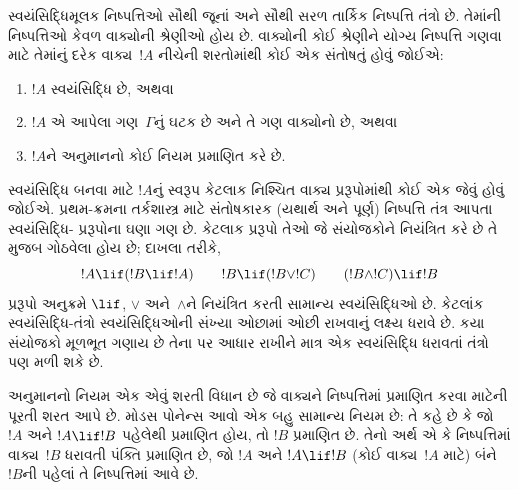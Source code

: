 \begingroup
\makeatletter{}\makeatother


\label{guunit:OLP-0068}


સ્વયંસિદ્ધિમૂલક નિષ્પત્તિઓ સૌથી જૂનાં અને સૌથી સરળ તાર્કિક
નિષ્પત્તિ તંત્રો છે. તેમાંની નિષ્પત્તિઓ કેવળ વાક્યોની
શ્રેણીઓ હોય છે. વાક્યોની કોઈ શ્રેણીને યોગ્ય નિષ્પત્તિ
ગણવા માટે તેમાંનું દરેક વાક્ય~$!A$ નીચેની શરતોમાંથી કોઈ એક
સંતોષતું હોવું જોઈએ:
\begin{enumerate}
\item $!A$ સ્વયંસિદ્ધિ છે, અથવા
\item $!A$ એ આપેલા ગણ~$\Gamma$નું ઘટક છે અને તે ગણ
  વાક્યોનો છે, અથવા
\item $!A$ને અનુમાનનો કોઈ નિયમ પ્રમાણિત કરે છે.
\end{enumerate}
સ્વયંસિદ્ધિ બનવા માટે $!A$નું સ્વરૂપ કેટલાક નિશ્ચિત વાક્ય
પ્રરૂપોમાંથી કોઈ એક જેવું હોવું જોઈએ. પ્રથમ-ક્રમના તર્કશાસ્ત્ર માટે
સંતોષકારક (યથાર્થ અને પૂર્ણ) નિષ્પત્તિ તંત્ર આપતા સ્વયંસિદ્ધિ-
પ્રરૂપોના ઘણા ગણ છે. કેટલાક પ્રરૂપો તેઓ જે સંયોજકોને નિયંત્રિત કરે છે
તે મુજબ ગોઠવેલા હોય છે; દાખલા તરીકે,
\[
!A \lif (!B \lif !A) \qquad !B \lif (!B \lor !C) \qquad (!B \land !C) \lif !B
\]
પ્રરૂપો અનુક્રમે $\lif$, $\lor$ અને~$\land$ને નિયંત્રિત કરતી સામાન્ય
સ્વયંસિદ્ધિઓ છે. કેટલાંક સ્વયંસિદ્ધિ-તંત્રો સ્વયંસિદ્ધિઓની સંખ્યા
ઓછામાં ઓછી રાખવાનું લક્ષ્ય ધરાવે છે. કયા સંયોજકો મૂળભૂત ગણાય છે તેના
પર આધાર રાખીને માત્ર એક સ્વયંસિદ્ધિ ધરાવતાં તંત્રો પણ મળી શકે છે.

અનુમાનનો નિયમ એક એવું શરતી વિધાન છે જે વાક્યને
નિષ્પત્તિમાં પ્રમાણિત કરવા માટેની પૂરતી શરત આપે છે. મોડસ પોનેન્સ
આવો એક બહુ સામાન્ય નિયમ છે: તે કહે છે કે જો $!A$ અને $!A \lif !B$
પહેલેથી પ્રમાણિત હોય, તો $!B$ પ્રમાણિત છે. તેનો અર્થ એ કે
નિષ્પત્તિમાં વાક્ય~$!B$ ધરાવતી પંક્તિ પ્રમાણિત છે, જો
$!A$ અને $!A \lif !B$ (કોઈ વાક્ય~$!A$ માટે) બંને~$!B$ની પહેલાં
તે નિષ્પત્તિમાં આવે છે.

